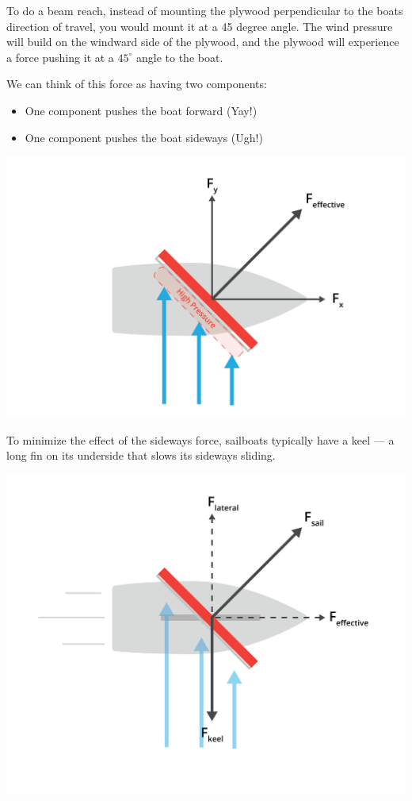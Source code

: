 To do a beam reach,  instead of mounting the plywood perpendicular to the boats direction of travel,  you would mount it at a 45 degree angle. The wind pressure will build on the windward
side of the plywood,  and the plywood will experience a force pushing it at a $45^\circ$ angle to the boat.

We can think of this force as having two components:
\begin{itemize}
\item One component pushes the boat forward (Yay!)
\item One component pushes the boat sideways (Ugh!)
\end{itemize}
\begin{center}
    \includegraphics[width=.75\textwidth]{pressure.png}

\end{center}
To minimize the effect of the sideways force,  sailboats typically have  a keel --- a long fin on its underside that slows its sideways sliding.

\begin{center}
    \includegraphics[width=.75\textwidth]{pressure2.png}

\end{center}

